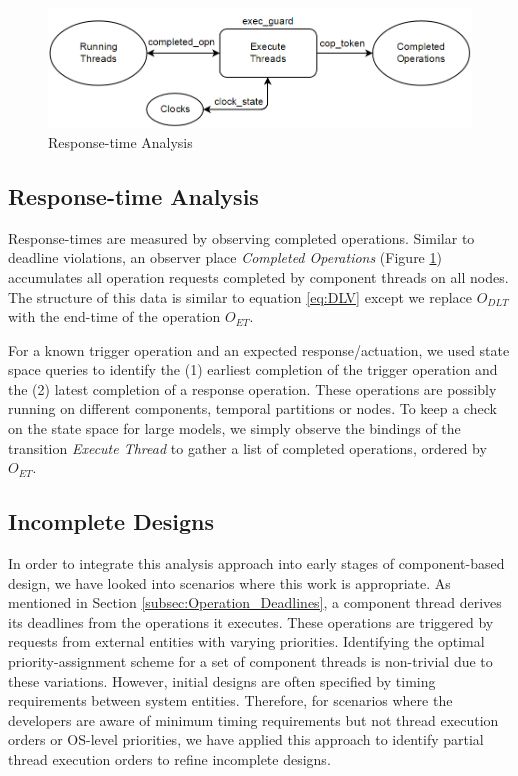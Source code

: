 \begin{figure}[htb]
	\centering
	\includegraphics[width=\textwidth]{./img/Response_Times.png}
	\caption{Response-time Analysis}
	\label{fig:COP}
\end{figure}

\subsection{Response-time Analysis}

Response-times are measured by observing completed operations. Similar to deadline violations, an observer place \emph{Completed Operations} (Figure \ref{fig:COP}) accumulates all operation requests completed by component threads on all nodes. The structure of this data is similar to equation \ref{eq:DLV} except we replace $O_{DLT}$ with the end-time of the operation $O_{ET}$.

For a known trigger operation and an expected response/actuation, we used state space queries to identify the (1) earliest completion of the trigger operation and the (2) latest completion of a response operation. These operations are possibly running on different components, temporal partitions or nodes. To keep a check on the state space for large models, we simply observe the bindings of the transition \emph{Execute Thread} to gather a list of completed operations, ordered by $O_{ET}$.

\subsection{Incomplete Designs}

In order to integrate this analysis approach into early stages of component-based design, we have looked into scenarios where this work is appropriate. As mentioned in Section \ref{subsec:Operation_Deadlines}, a component thread derives its deadlines from the operations it executes. These operations are triggered by requests from external entities with varying priorities. Identifying the optimal priority-assignment scheme for a set of component threads is non-trivial due to these variations. However, initial designs are often specified by timing requirements between system entities. Therefore, for scenarios where the developers are aware of minimum timing requirements but not thread execution orders or OS-level priorities, we have applied this approach to identify partial thread execution orders to refine incomplete designs. 

